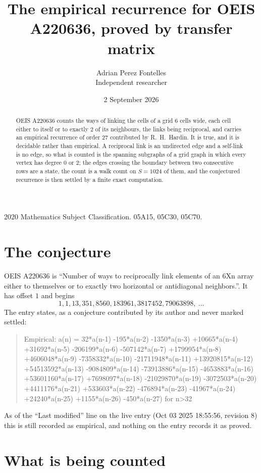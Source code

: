 \documentclass[11pt,a4paper]{article}
\title{The empirical recurrence for OEIS A220636, proved by transfer matrix}
\author{Adrian Perez Fontelles\\ \small Independent researcher}
\date{2 September 2026}
\theoremstyle{plain}
\theoremstyle{definition}
\begin{document}
\maketitle

\begin{abstract}
OEIS A220636 counts the ways of linking the cells of a grid $6$ cells wide, each cell either to
itself or to exactly $2$ of its neighbours, the links being reciprocal, and carries an
empirical recurrence of order $27$ contributed by R.~H.~Hardin. It is true, and it is
decidable rather than empirical. A reciprocal link is an undirected edge and a self-link is
no edge, so what is counted is the spanning subgraphs of a grid graph in which every vertex
has degree $0$ or $2$; the edges crossing the boundary between two consecutive rows are a
state, the count is a walk count on $S=1024$ of them, and the conjectured recurrence is then
settled by a finite exact computation.
\end{abstract}

\noindent\small 2020 Mathematics Subject Classification. 05A15, 05C30, 05C70.\normalsize

\section{The conjecture}

OEIS A220636 is ``Number of ways to reciprocally link elements of an 6Xn array either to themselves or to exactly two horizontal or antidiagonal neighbors.''. It has offset $1$ and begins
\[
1, 1, 13, 351, 8560, 183961, 3817452, 79063898,\ \dots
\]
The entry states, as a conjecture contributed by its author and never marked settled:
\begin{quote}
Empirical: a(n) = 32*a(n-1) -195*a(n-2) -1350*a(n-3) +10665*a(n-4) +31692*a(n-5) -206199*a(n-6) -507142*a(n-7) +1799954*a(n-8) +4606048*a(n-9) -7358332*a(n-10) -21711948*a(n-11) +13920815*a(n-12) +54513592*a(n-13) -9084809*a(n-14) -73913886*a(n-15) -4653883*a(n-16) +53601160*a(n-17) +7698097*a(n-18) -21029870*a(n-19) -3072503*a(n-20) +4411176*a(n-21) +533603*a(n-22) -476894*a(n-23) -41967*a(n-24) +24240*a(n-25) +1155*a(n-26) -450*a(n-27) for n>32
\end{quote}
As of the ``Last modified'' line on the live entry (Oct 03 2025 18:55:56, revision 8) this is still
recorded as empirical, and nothing on the entry records it as proved.

\section{What is being counted}
\end{document}
